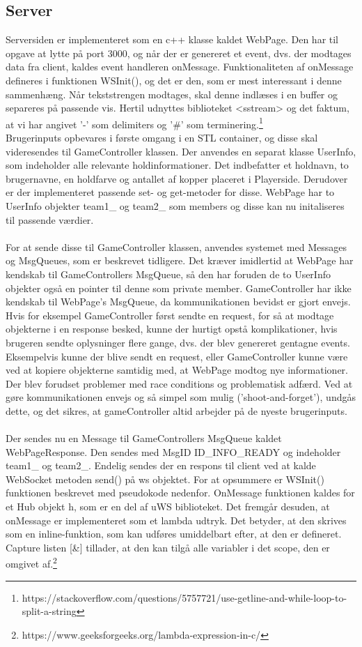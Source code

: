 \documentclass[Softwaredesign/Softwaredesign_main.tex]{subfiles}
\begin{document}
\subsection{Server}
Serversiden er implementeret som en c++ klasse kaldet WebPage. Den har til opgave at lytte på port 3000, og når der er genereret et event, dvs. der modtages data fra client, kaldes event handleren onMessage. Funktionaliteten af onMessage defineres i funktionen WSInit(), og det er den, som er mest interessant i denne sammenhæng. Når tekststrengen modtages, skal denne indlæses i en buffer og separeres på passende vis. Hertil udnyttes biblioteket <sstream> og det faktum, at vi har angivet '-' som delimiters og '\#' som terminering.\footnote{https://stackoverflow.com/questions/5757721/use-getline-and-while-loop-to-split-a-string} \\Brugerinputs opbevares i første omgang i en STL container, og disse skal videresendes til GameController klassen. Der anvendes en separat klasse UserInfo, som indeholder alle relevante holdinformationer. Det indbefatter et holdnavn, to brugernavne, en holdfarve og antallet af kopper placeret i Playerside. Derudover er der implementeret passende set- og get-metoder for disse. WebPage har to UserInfo objekter team1\_ og team2\_ som members og disse kan nu initaliseres til passende værdier. \\\\For at sende disse til GameController klassen, anvendes systemet med Messages og MsgQueues, som er beskrevet tidligere. Det kræver imidlertid at WebPage har kendskab til GameControllers MsgQueue, så den har foruden de to UserInfo objekter også en pointer til denne som private member. GameController har ikke kendskab til WebPage's MsgQueue, da kommunikationen bevidst er gjort envejs. Hvis for eksempel GameController først sendte en request, for så at modtage objekterne i en response besked, kunne der hurtigt opstå komplikationer, hvis brugeren sendte oplysninger flere gange, dvs. der blev genereret gentagne events. Eksempelvis kunne der blive sendt en request, eller GameController kunne være ved at kopiere objekterne samtidig med, at WebPage modtog nye informationer. Der blev forudset problemer med race conditions og problematisk adfærd. Ved at gøre kommunikationen envejs og så simpel som mulig ('shoot-and-forget'), undgås dette, og det sikres, at gameController altid arbejder på de nyeste brugerinputs.
\\\\Der sendes nu en Message til GameControllers MsgQueue kaldet WebPageResponse. Den sendes med MsgID ID\_INFO\_READY og indeholder team1\_ og team2\_. Endelig sendes der en respons til client ved at kalde WebSocket metoden send() på ws objektet. For at opsummere er WSInit() funktionen beskrevet med pseudokode nedenfor. OnMessage funktionen kaldes for et Hub objekt h, som er en del af uWS biblioteket. Det fremgår desuden, at onMessage er implementeret som et lambda udtryk. Det betyder, at den skrives som en inline-funktion, som kan udføres umiddelbart efter, at den er defineret. Capture listen [\&] tillader, at den kan tilgå alle variabler i det scope, den er omgivet af.\footnote{https://www.geeksforgeeks.org/lambda-expression-in-c/}
\end{document}
